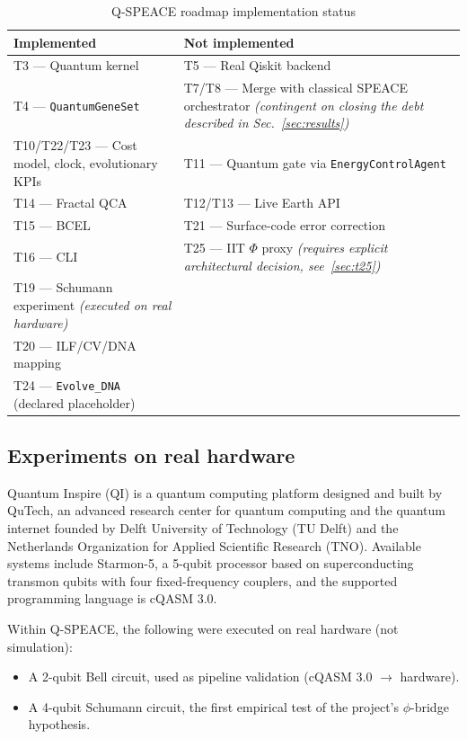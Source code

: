 \documentclass[11pt,a4paper]{article}
\newcommand{\code}[1]{\texttt{#1}}
\newcommand{\starmon}{Starmon-5\xspace}
\begin{document}
\begin{table}[h]
\centering
\caption{Q-SPEACE roadmap implementation status}
\label{tab:roadmap}
\begin{tabular}{p{5.5cm}p{5.5cm}}
\toprule
\textbf{Implemented} & \textbf{Not implemented} \\
\midrule
T3 --- Quantum kernel & T5 --- Real Qiskit backend \\
T4 --- \code{QuantumGeneSet} & T7/T8 --- Merge with classical SPEACE orchestrator \emph{(contingent on closing the debt described in Sec.~\ref{sec:results})} \\
T10/T22/T23 --- Cost model, clock, evolutionary KPIs & T11 --- Quantum gate via \code{EnergyControlAgent} \\
T14 --- Fractal QCA & T12/T13 --- Live Earth API \\
T15 --- BCEL & T21 --- Surface-code error correction \\
T16 --- CLI & T25 --- IIT $\Phi$ proxy \emph{(requires explicit architectural decision, see~\ref{sec:t25})} \\
T19 --- Schumann experiment \emph{(executed on real hardware)} & \\
T20 --- ILF/CV/DNA mapping & \\
T24 --- \code{Evolve\_DNA} (declared placeholder) & \\
\bottomrule
\end{tabular}
\end{table}

\subsection{Experiments on real hardware}
\label{sec:qi-experiments}

Quantum Inspire (QI) is a quantum computing platform designed and built by QuTech, an advanced research center for quantum computing and the quantum internet founded by Delft University of Technology (TU Delft) and the Netherlands Organization for Applied Scientific Research (TNO). Available systems include \starmon, a 5-qubit processor based on superconducting transmon qubits with four fixed-frequency couplers, and the supported programming language is cQASM 3.0.

Within Q-SPEACE, the following were executed on real hardware (not simulation):

\begin{itemize}
  \item A 2-qubit Bell circuit, used as pipeline validation (cQASM 3.0 $\to$ hardware).
  \item A 4-qubit Schumann circuit, the first empirical test of the project's $\phi$-bridge hypothesis.
\end{itemize}
\end{document}
